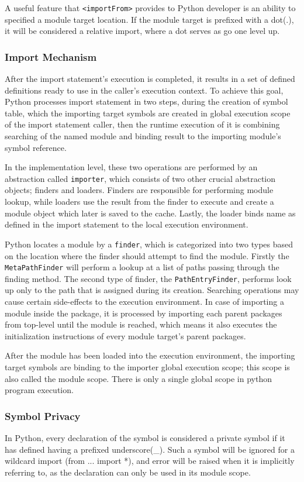A useful feature that \texttt{<importFrom>} provides to Python developer is an ability to specified a module target location. If the module target is prefixed with a dot(.), it will be considered a relative import, where a dot serves as go one level up.


\subsubsection{Import Mechanism}

After the import statement's execution is completed, it results in a set of defined definitions ready to use in the caller's execution context.
To achieve this goal, Python processes import statement in two steps, during the creation of symbol table, which the importing target symbols are created in global execution scope of the import statement caller, then the runtime execution of it is combining searching of the named module and binding result to the importing module's symbol reference.

In the implementation level, these two operations are performed by an abstraction called \texttt{importer}, which consists of two other crucial abstraction objects; finders and loaders.
Finders are responsible for performing module lookup, while loaders use the result from the finder to execute and create a module object which later is saved to the cache.
Lastly, the loader binds name as defined in the import statement to the local execution environment.

Python locates a module by a \texttt{finder}, which is categorized into two types based on the location where the finder should attempt to find the module.
Firstly the \texttt{MetaPathFinder} will perform a lookup at a list of paths passing through the finding method.
The second type of finder, the \texttt{PathEntryFinder}, performs look up only to the path that is assigned during its creation.
Searching operations may cause certain side-effects to the execution environment. In case of importing a module inside the package, it is processed by importing each parent packages from top-level until the module is reached, which means it also executes the initialization instructions of every module target's parent packages.

After the module has been loaded into the execution environment, the importing target symbols are binding to the importer global execution scope; this scope is also called the module scope. There is only a single global scope in python program execution.

\subsubsection{Symbol Privacy}

In Python, every declaration of the symbol is considered a private symbol if it has defined having a prefixed underscore(\_). Such a symbol will be ignored for a wildcard import (from ... import *), and error will be raised when it is implicitly referring to, as the declaration can only be used in its module scope.
